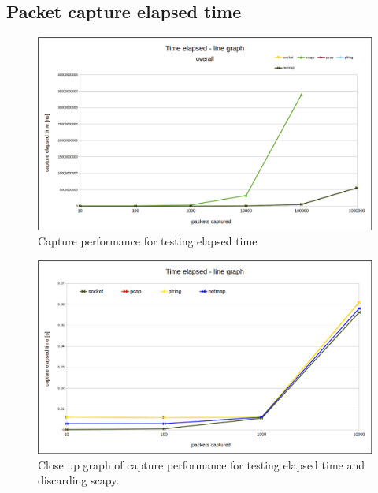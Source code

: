 \documentclass[12pt,a4paper,twoside]{report}
\begin{document}
\begin{appendices}
	\chapter{Packet capture elapsed time} \label{appendix:tests:graph:timed}
		\begin{figure}[h]
			\centering
			\includegraphics[scale=0.39]{overall_speed_line-graph}
			\caption{Capture performance for testing elapsed time}
			\label{figure:tests:alltimed}
		\end{figure}
		\begin{figure}[h]
			\centering
			\includegraphics[scale=0.39]{closeup_speed_line-graph}
			\caption{Close up graph of capture performance for testing elapsed time and discarding scapy.}
			\label{figure:tests:closetimed}
		\end{figure}
		\begin{figure}[h]
			\centering

\end{figure}
\end{appendices}
\end{document}

